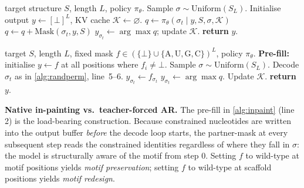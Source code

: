 \documentclass{article}
\begin{document}
\begin{algorithm}[t]
  \caption{Random-permutation argmax decoding.}
  \label{alg:randperm}
  \begin{algorithmic}[1]
     target structure $S$, length $L$,
      policy $\pi_\theta$.
    \STATE Sample $\sigma \sim \mathrm{Uniform}(S_L)$.
    \STATE Initialise output $y \leftarrow [\bot]^L$,
      KV cache $\mathcal{K} \leftarrow \varnothing$.
      \STATE $q \leftarrow \pi_\theta(\sigma_t \mid y, S, \sigma,
        \mathcal{K})$ 
      \STATE $q \leftarrow q + \mathrm{Mask}(\sigma_t, y, S)$
      \STATE $y_{\sigma_t} \leftarrow \arg\max q$;
        update $\mathcal{K}$.
    \ENDFOR
    \STATE \textbf{return} $y$.
  \end{algorithmic}
\end{algorithm}

\begin{algorithm}[t]
  \caption{In-painting via fixed-mask pre-fill.}
  \label{alg:inpaint}
  \begin{algorithmic}[1]
     target $S$, length $L$,
      fixed mask $f \in (\{\bot\} \cup \{\mathrm{A,U,G,C}\})^L$,
      policy $\pi_\theta$.
    \STATE \textbf{Pre-fill:} initialise $y \leftarrow f$ at all
      positions where $f_i \neq \bot$.
    \STATE Sample $\sigma \sim \mathrm{Uniform}(S_L)$.
      \STATE Decode $\sigma_t$ as in \cref{alg:randperm}, line~5--6.
        \STATE $y_{\sigma_t} \leftarrow f_{\sigma_t}$
      \ELSE
        \STATE $y_{\sigma_t} \leftarrow \arg\max q$.
      \ENDIF
      \STATE Update $\mathcal{K}$.
    \ENDFOR
    \STATE \textbf{return} $y$.
  \end{algorithmic}
\end{algorithm}

\noindent\textbf{Native in-painting vs.\ teacher-forced AR.}
The pre-fill in \cref{alg:inpaint} (line 2) is the load-bearing
construction. Because constrained nucleotides are written into the
output buffer \emph{before} the decode loop starts, the partner-mask
at every subsequent step reads the constrained identities regardless
of where they fall in $\sigma$: the model is structurally aware of the
motif from step 0. Setting $f$ to wild-type at motif positions yields
\emph{motif preservation}; setting $f$ to wild-type at scaffold
positions yields \emph{motif redesign}.
\end{document}
